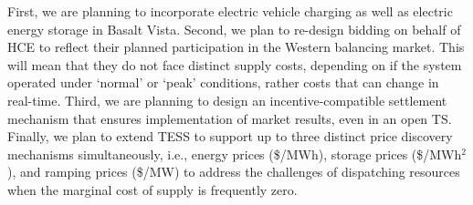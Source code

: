 First, we are planning to incorporate electric vehicle charging as well as electric energy storage in Basalt Vista. 
Second, we plan to re-design bidding on behalf of HCE to reflect their planned participation in the Western balancing market. This will mean that they do not face distinct supply costs, depending on if the system operated under `normal' or `peak' conditions, rather costs that can change in real-time.
Third, we are planning to design an incentive-compatible settlement mechanism that ensures implementation of market results, even in an open TS.
Finally, we plan to extend TESS to support up to three distinct price discovery mechanisms simultaneously, i.e., energy prices (\$/MWh), storage prices (\$/MWh$^2$), and ramping prices (\$/MW) to address the challenges of dispatching resources when the marginal cost of supply is frequently zero.
